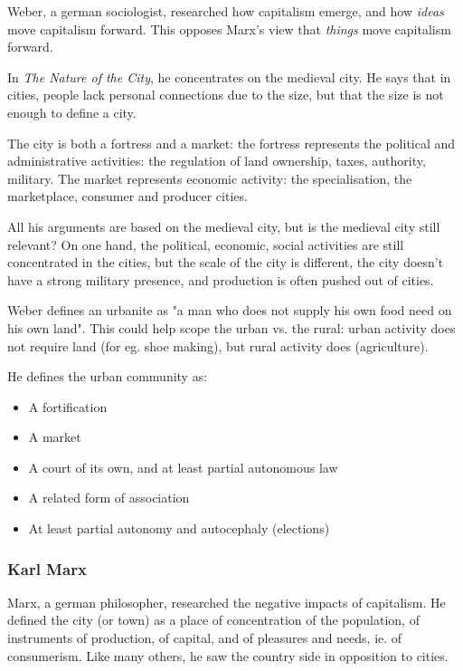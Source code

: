 \documentclass{article}
\begin{document}
Weber, a german sociologist, researched how capitalism emerge, and how \textit{ideas} move capitalism forward. This opposes Marx's view that \textit{things} move capitalism forward.

In \textit{The Nature of the City}, he concentrates on the medieval city. He says that in cities, people lack personal connections due to the size, but that the size is not enough to define a city.

The city is both a fortress and a market: the fortress represents the political and administrative activities: the regulation of land ownership, taxes, authority, military. The market represents economic activity: the specialisation, the marketplace, consumer and producer cities.

All his arguments are based on the medieval city, but is the medieval city still relevant?  On one hand, the political, economic, social activities are still concentrated in the cities, but the scale of the city is different, the city doesn't have a strong military presence, and production is often pushed out of cities.

Weber defines an urbanite as "a man who does not supply his own food need on his own land". This could help scope the urban vs. the rural: urban activity does not require land (for eg. shoe making), but rural activity does (agriculture). 

He defines the urban community as:

\begin{itemize}
  \item A fortification
  \item A market
  \item A court of its own, and at least partial autonomous law
  \item A related form of association
  \item At least partial autonomy and autocephaly (elections)
\end{itemize}

\subsubsection{Karl Marx}

Marx, a german philosopher, researched the negative impacts of capitalism. He defined the city (or town) as a place of concentration of the population, of instruments of production, of capital, and of pleasures and needs, ie. of consumerism.
Like many others, he saw the country side in opposition to cities. 
\end{document}
